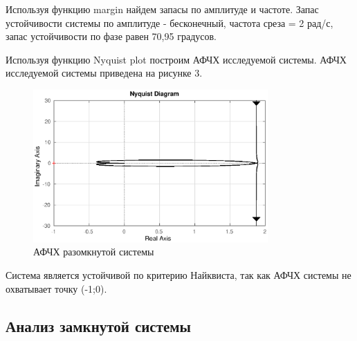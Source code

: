 \documentclass[12pt, a4paper]{article}
\begin{document}
\par Используя функцию margin найдем запасы по амплитуде и частоте. Запас устойчивости системы по амплитуде - бесконечный, частота среза = 2 рад/с,
запас устойчивости по фазе равен 70,95 градусов.
\par Используя функцию Nyquist plot построим АФЧХ исследуемой системы. АФЧХ исследуемой системы приведена на рисунке 3.
\begin{figure}[H]
\centering
\includegraphics[width=0.8\textwidth]{1/nyq1.eps}
\caption{АФЧХ разомкнутой системы}
\end{figure}
\par Система является устойчивой по критерию Найквиста, так как АФЧХ системы не охватывает точку (-1;0).


\newpage
\begin{center}
\section{Анализ замкнутой системы }
\end{center} \par
\end{document}
